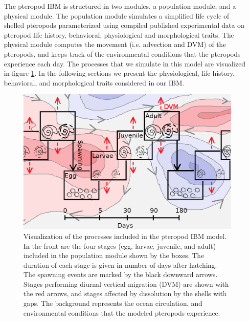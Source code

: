 
The pteropod IBM is structured in two modules, a population module, and a physical module. The population module simulates a simplified life cycle of shelled pteropods parameterized using compiled published experimental data on pteropod life history, behavioral, physiological and morphological traits. The physical module computes the movement (i.e. advection and DVM) of the pteropods, and keeps track of the environmental conditions that the pteropods experience each day. The processes that we simulate in this model are visualized in figure \ref{fig:model_visualization}. In the following sections we present the physiological, life history, behavioral, and morphological traits considered in our IBM.



\begin{figure}[tbh!]
    \centering
    
        \includegraphics[scale=0.5]{images/model_visualization_sketch_with_circulation.png}
       
    
    \caption{Visualization of the processes included in the pteropod IBM model. In the front are the four stages (egg, larvae, juvenile, and adult) included in the population module shown by the boxes. The duration of each stage is given in number of days after hatching. The spawning events are marked by the black downward arrows. Stages performing diurnal vertical migration (DVM) are shown with the red arrows, and stages affected by dissolution by the shells with gaps. The background represents the ocean circulation, and environmental conditions that the modeled pteropods experience.}
    \label{fig:model_visualization}
\end{figure}

